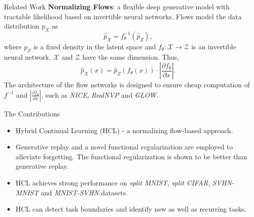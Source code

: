 \documentclass{beamer}
\begin{document}


\begin{frame}{Related Work}
  \textbf{Normalizing Flows}: a flexible deep generative model with tractable likelihood 
  based on invertible neural networks. Flows model the data distribution $p_X$ as
  \[
    \hat{p}_X = f_\theta^{-1}(\hat{p}_Z),
  \]
  where $\hat{p}_Z$ is a fixed density in the latent space and 
  $f_\theta : \mathcal{X} \rightarrow \mathcal{Z}$ is an invertible neural network.
  $\mathcal{X}$ and $\mathcal{Z}$ have the same dimension. Thus,
  \[
    \hat{p}_X(x) = \hat{p}_Z(f_\theta(x)) \cdot \left| \frac{\partial f_\theta}{\partial x} \right|.
  \]
  The architecture of the flow networks is designed to ensure cheap computation of $f^{-1}$ and $\left| \frac{\partial f_\theta}{\partial x} \right|$,
  such as \emph{NICE}, \emph{RealNVP} and \emph{GLOW}.
\end{frame}

\begin{frame}{The Contributions}
  \begin{itemize}
    \item <1-> Hybrid Continual Learning (HCL) - a normalizing flow-based approach.
    \item Generative replay and a novel functional regularization are employed to alleviate forgetting. The functional regularization is shown to be better than generative replay.
    \item <1-> HCL achieves strong performance on \emph{split MNIST}, \emph{split CIFAR}, \emph{SVHN-MNIST} and \emph{MNIST-SVHN} datasets.
    \item <1-> HCL can detect task boundaries and identify new as well as recurring tasks.
  \end{itemize}
\end{frame}

\end{document}
